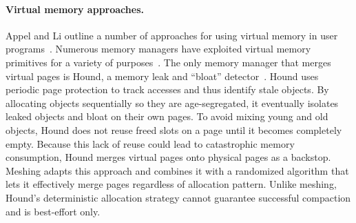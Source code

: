 \paragraph{Virtual memory approaches.}
Appel and Li outline a number of approaches for using virtual memory
in user programs~\cite{Appel:1991:VMP:106972.106984}. Numerous memory
managers have exploited virtual memory primitives for a variety of
purposes~\cite{Novark:2010:DSH:1866307.1866371,1346296,Appel:1988:RCC:53990.53992,Boehm:1991:MPG:113445.113459,Dhurjati:2006:EDD:1135532.1135707,electricfence,pageheap}. The
only memory manager that merges virtual pages is Hound, a memory leak
and ``bloat'' detector~\cite{1542521}. Hound uses periodic page
protection to track accesses and thus identify stale objects. By
allocating objects sequentially so they are age-segregated, it
eventually isolates leaked objects and bloat on their own pages. To
avoid mixing young and old objects, Hound does not reuse freed slots
on a page until it becomes completely empty. Because this lack of
reuse could lead to catastrophic memory consumption, Hound merges
virtual pages onto physical pages as a backstop. Meshing adapts this
approach and combines it with a randomized algorithm that lets it
effectively merge pages regardless of allocation pattern. Unlike
meshing, Hound's deterministic allocation strategy cannot guarantee
successful compaction and is best-effort only.
